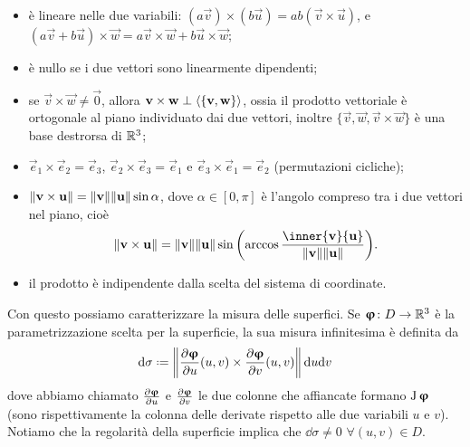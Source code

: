 \begin{itemize}
	\item è lineare nelle due variabili: $(a\vec v)\times(b\vec u)=ab(\vec v\times\vec u)$, e $(a\vec v+b\vec u)\times\vec w=a\vec v\times\vec w+b\vec u\times\vec w$;
	\item è nullo se i due vettori sono linearmente dipendenti;
	\item se $\vec v\times\vec w\neq\vec 0$, allora $\mathbf{v}\times\mathbf{w}\perp\left\langle{\{\mathbf{v},\mathbf{w}\}}\right\rangle$, ossia il prodotto vettoriale è ortogonale al piano individuato dai due vettori, inoltre $\{\vec v,\vec w,\vec v\times\vec w\}$ è una base destrorsa di $\mathbb{R}^3$;
	\item $\vec e_1\times\vec e_2=\vec e_3$, $\vec e_2\times\vec e_3=\vec e_1$ e $\vec e_3\times\vec e_1=\vec e_2$ (permutazioni cicliche);
	\item $\lVert\mathbf{v}\times\mathbf{u}\rVert=\lVert\mathbf{v}\rVert\lVert\mathbf{u}\rVert\sin\alpha$, dove $\alpha\in[0,\pi]$ è l'angolo compreso tra i due vettori nel piano, cioè
		\begin{equation}
			\norm{\vec v\times\vec u}=\norm{\vec v}\norm{\vec u}\sin\bigg(\!\arccos\frac{\inner{\vec v}{\vec u}}{\norm{\vec v}\norm{\vec u}}\bigg).
		\end{equation}
	\item il prodotto è indipendente dalla scelta del sistema di coordinate.
\end{itemize}

Con questo possiamo caratterizzare la misura delle superfici.
Se $\bm{\upvarphi}\colon D\to\mathbb{R}^3$ è la parametrizzazione scelta per la superficie, la sua misura infinitesima è definita da
\begin{equation}
	\dd\sigma\defeq\norm[\bigg]{\drp{\vphi}{u}(u,v)\times\drp{\vphi}{v}(u,v)}\,\dd u\dd v
	\label{eq:misura-superficie}
\end{equation}
dove abbiamo chiamato $\frac{\partial {\bm{\upvarphi}}}{\partial {u}}$ e $\frac{\partial {\bm{\upvarphi}}}{\partial {v}}$ le due colonne che affiancate formano $\operatorname{J}\bm{\upvarphi}$ (sono rispettivamente la colonna delle derivate rispetto alle due variabili $u$ e $v$).
Notiamo che la regolarità della superficie implica che $\dd\sigma\ne 0$ $\forall(u,v)\in D$.

